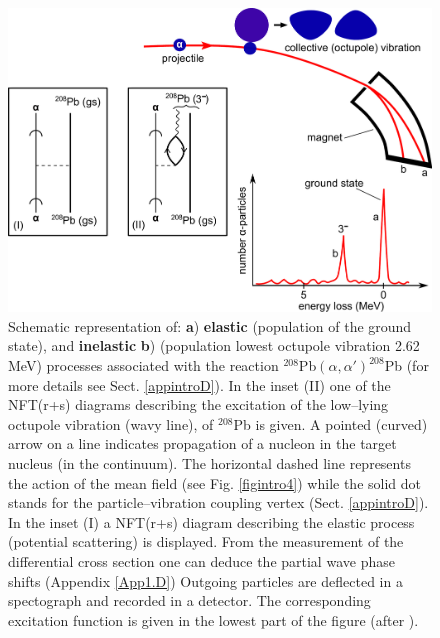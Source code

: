 \begin{figure}
\centerline {
\includegraphics*[width=15cm]{introduccion/figs/figintro1}
}
\caption{Schematic representation of: \textbf{a}) \textbf{elastic} (population of the ground state), and \textbf{inelastic} \textbf{b}) (population lowest octupole vibration 2.62 MeV) processes associated with the reaction $^{208}$Pb$(\alpha,\alpha')^{208}$Pb (for more details see Sect. \ref{appintroD}). In the inset (II) one of the NFT(r+s) diagrams describing the  excitation of the low--lying octupole vibration (wavy line), of $^{208}$Pb  is given. A pointed (curved) arrow on a line indicates propagation of a nucleon in the target nucleus (in the continuum). The horizontal dashed line represents the action of the mean field (see Fig. \ref{figintro4}) while the solid dot stands for the particle--vibration coupling vertex (Sect. \ref{appintroD}). In the inset (I) a NFT(r+s) diagram describing  the elastic process (potential scattering) is displayed. From the measurement of the differential cross section one can deduce the partial wave phase shifts (Appendix \ref{App1.D}) Outgoing particles are deflected in a spectograph and recorded in a detector. The corresponding excitation function is given in the lowest part of the figure (after \cite{Mottelson:76b}).}
\label{figintro1}
\end{figure}
